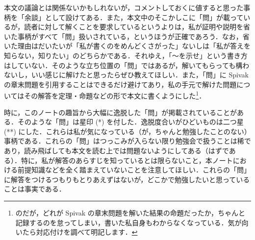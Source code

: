 本文の議論とは関係ないかもしれないが，コメントしておくに値すると思った事柄を「余談」として設けてある．また，本文中のそこかしこに「問」が載っているが，読者に対して解くことを要求しているというよりは，私が証明や説明を省いた事柄がすべて「問」扱いされている，というほうが正確であろう．なお，省いた理由はだいたいが「私が書くのをめんどくさがった」ないしは「私が答えを知らない，知りたい」のどちらかである．それゆえ，「〜を示せ」という書き方はしていない．そのような立ち位置の「問」ではあるが，解いてもらっても構わないし，いい感じに解けたと思ったらぜひ教えてほしい．また，「問」に Spivak の章末問題を引用することはできるだけ避けてあり，私の手元で解けた問題についてはその解答を定理・命題などの形で本文に書くようにした\footnote{のだが，どれが Spivak の章末問題を解いた結果の命題だったか，ちゃんと記録するのを怠ってしまい，書いた私自身もわからなくなっている．気が向いたら対応付けを調べて明記します．}．

時に，このノートの趣旨から大幅に逸脱した「問」が掲載されていることがある．そのような「問」は星印 (*) を付した．逸脱度合いがひどいものは二つ星 (**) にした．これらは私が気になっている（が，ちゃんと勉強したことのない）事柄である．これらの「問」はつっこみが入らない限り勉強会で扱うことは稀であり，読み飛ばしても本文を読む上では問題ないようにしてある（はずである）．特に，私が解答のあらすじを知っているとは限らないこと，本ノートにおける前提知識などを全く踏まえていないことを注意してほしい．これらの「問」に解答をつけるつもりもとりあえずはないが，どこかで勉強したいと思っていることは事実である．
